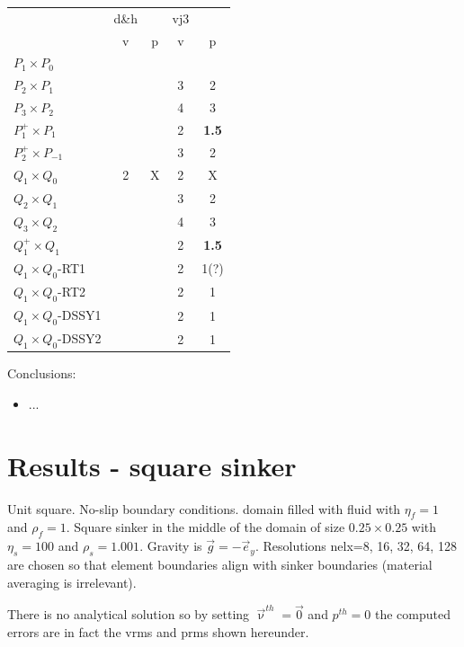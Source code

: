 \newpage
\begin{tabular}{l|cc|cc|}
\hline
                     & d\&h &   & vj3 & \\
                     & v    & p & v & p \\
\hline
\hline
$P_1\times P_0$       &      &   &  &   \\
$P_2\times P_1$       &      &   & 3 & 2  \\
$P_3\times P_2$       &      &   & 4 & 3  \\
$P_1^+\times P_{1}$   &      &   & 2 & {\bf 1.5}  \\
$P_2^+\times P_{-1}$  &      &   & 3 & 2  \\
$Q_1\times Q_0$       & 2    & X & 2 & X  \\
$Q_2\times Q_1$       &      &   & 3 & 2  \\
$Q_3\times Q_2$       &      &   & 4 & 3  \\
$Q_1^+\times Q_1$     &      &   & 2 & {\bf 1.5}  \\
$Q_1\times Q_0$-RT1   &      &   & 2 & 1(?)  \\
$Q_1\times Q_0$-RT2   &      &   & 2 & 1  \\
$Q_1\times Q_0$-DSSY1 &      &   & 2 & 1  \\
$Q_1\times Q_0$-DSSY2 &      &   & 2 & 1  \\
\hline
\end{tabular} 

\vspace{1cm}

Conclusions:
\begin{itemize}
\item ...
\end{itemize}

\newpage
\section*{Results - square sinker}

Unit square. No-slip boundary conditions. domain filled with fluid with $\eta_f=1$ and $\rho_f=1$.
Square sinker in the middle of the domain of size $0.25\times 0.25$ with $\eta_s=100$ and
$\rho_s=1.001$. Gravity is $\vec{g}=-\vec{e}_y$. Resolutions nelx=8, 16, 32, 64, 128 
are chosen so that element boundaries align with sinker boundaries 
(material averaging is irrelevant). 

There is no analytical solution so by setting $\vec{\upnu}^{th}=\vec{0}$ and 
$p^{th}=0$ the computed errors are in fact the vrms and prms shown hereunder.

